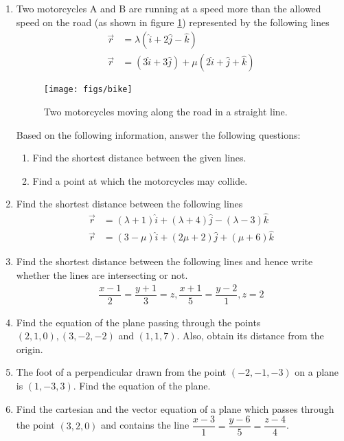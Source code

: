 \begin{enumerate}
	\item Two motorcycles A and B are running at a speed more than the allowed speed on the road (as shown in figure \ref{fig:bike1}) represented by the following lines 
		\begin{align}
			\vec{r}&=\lambda(\hat{i}+2\hat{j}-\hat{k})\\\vec{r}&=(3\hat{i}+3\hat{j})+\mu(2\hat{i}+\hat{j}+\hat{k})
		\end{align}
		\begin{figure}[H]
			\centering
			\texttt{[image: figs/bike]}
			\caption{Two motorcycles moving along the road in a straight line.}
			\label{fig:bike1}
		\end{figure}
		Based on the following information, answer the following questions:
		\begin{enumerate}
			\item Find the shortest distance between the given lines.
			\item Find a point at which the motorcycles may collide.
		\end{enumerate}
	
	\item Find the shortest distance between the following lines
		\begin{align}
			\vec{r}&=(\lambda+1)\hat{i}+(\lambda+4)\hat{j}-(\lambda-3)\hat{k}\\\vec{r}&=(3-\mu)\hat{i}+(2\mu+2)\hat{j}+(\mu+6)\hat{k}
		\end{align}
	
	\item Find the shortest distance between the following lines and hence write whether the lines are intersecting or not.
		\begin{align}
			\dfrac{x-1}{2}=\dfrac{y+1}{3}=z, \dfrac{x+1}{5}=\dfrac{y-2}{1}, z=2
		\end{align}

		\item Find the equation of the plane passing through the points $(2,1,0),(3,-2,-2)$ and $(1,1,7)$. Also, obtain its distance from the origin.

	\item The foot of a perpendicular drawn from the point $(-2,-1,-3)$ on a plane is $(1,-3,3)$. Find the equation of the plane.

	\item Find the cartesian and the vector equation of a plane which passes through the point $(3,2,0)$ and contains the line $\dfrac{x-3}{1}=\dfrac{y-6}{5}=\dfrac{z-4}{4}$.


\end{enumerate}
